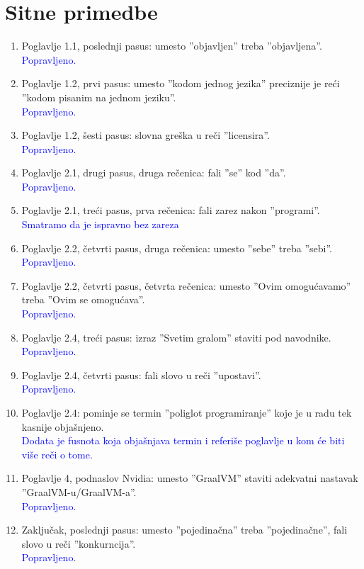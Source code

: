 \documentclass[a4paper]{report}
\newcommand{\odgovor}[1]{\textcolor{blue}{#1}}
\begin{document}
	\section{Sitne primedbe}
	\begin{enumerate}
		\item Poglavlje 1.1, poslednji pasus: umesto ''objavljen'' treba ''objavljena''.\\
		\odgovor{Popravljeno.}
		\item Poglavlje 1.2, prvi pasus: umesto ''kodom jednog jezika'' preciznije je reći ''kodom pisanim na jednom jeziku''.\\
		\odgovor{Popravljeno.}
		\item Poglavlje 1.2, šesti pasus: slovna greška u reči ''licensira''.\\
		\odgovor{Popravljeno.}
		\item Poglavlje 2.1, drugi pasus, druga rečenica: fali ''se'' kod ''da''.\\
		\odgovor{Popravljeno.}
		\item Poglavlje 2.1, treći pasus, prva rečenica: fali zarez nakon ''programi''.\\
		\odgovor{Smatramo da je ispravno bez zareza}
		\item Poglavlje 2.2, četvrti pasus, druga rečenica: umesto ''sebe'' treba ''sebi''.\\
		\odgovor{Popravljeno.}
		\item Poglavlje 2.2, četvrti pasus, četvrta rečenica: umesto ''Ovim omogućavamo''	treba ''Ovim se omogućava''.\\
		\odgovor{Popravljeno.}
		\item Poglavlje 2.4, treći pasus: izraz ''Svetim gralom''  staviti pod navodnike.\\
		\odgovor{Popravljeno.}
		\item Poglavlje 2.4, četvrti pasus: fali slovo u reči ''upostavi''.\\
		\odgovor{Popravljeno.}
		\item Poglavlje 2.4: pominje se termin ''poliglot programiranje'' koje je u radu tek kasnije objašnjeno.\\
		\odgovor{Dodata je fusnota koja objašnjava termin i referiše poglavlje u kom će biti više reči o tome.}
		\item Poglavlje 4, podnaslov Nvidia: umesto ''GraalVM'' staviti adekvatni nastavak ''GraalVM-u/GraalVM-a''.\\
		\odgovor{Popravljeno.}
		\item Zaključak, poslednji pasus: umesto ''pojedinačna'' treba ''pojedinačne'', fali slovo u reči ''konkurncija''.\\
		\odgovor{Popravljeno.}
	\end{enumerate}
	
\end{document}
